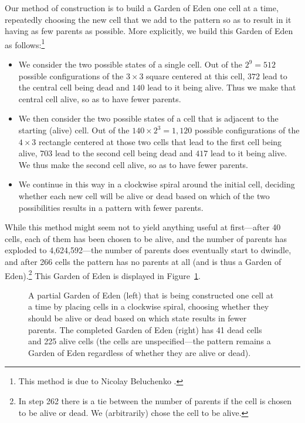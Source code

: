 Our method of construction is to build a Garden of Eden one cell at a time, repeatedly choosing the new cell that we add to the pattern so as to result in it having as few parents as possible. More explicitly, we build this Garden of Eden as follows:\footnote{This method is due to Nicolay Beluchenko \cite{A196447}.}\medskip

\begin{itemize}
	\item We consider the two possible states of a single cell. Out of the $2^9 = 512$ possible configurations of the $3 \times 3$ square centered at this cell, $372$ lead to the central cell being dead and $140$ lead to it being alive. Thus we make that central cell alive, so as to have fewer parents.\smallskip
	
	\item We then consider the two possible states of a cell that is adjacent to the starting (alive) cell. Out of the $140 \times 2^3 = 1,120$ possible configurations of the $4 \times 3$ rectangle centered at those two cells that lead to the first cell being alive, $703$ lead to the second cell being dead and $417$ lead to it being alive. We thus make the second cell alive, so as to have fewer parents.\smallskip
	
	\item We continue in this way in a clockwise spiral around the initial cell, deciding whether each new cell will be alive or dead based on which of the two possibilities results in a pattern with fewer parents.\medskip
\end{itemize}

While this method might seem not to yield anything useful at first---after 40 cells, each of them has been chosen to be alive, and the number of parents has exploded to 4,624,592---the number of parents does eventually start to dwindle, and after 266 cells the pattern has no parents at all (and is thus a Garden of Eden).\footnote{In step 262 there is a tie between the number of parents if the cell is chosen to be alive or dead. We (arbitrarily) chose the cell to be alive.} This Garden of Eden is displayed in Figure~\ref{fig:goe_1}.

\begin{figure}[!htb]
	\centering{}
	
	\caption{A partial Garden of Eden (left) that is being constructed one cell at a time by placing cells in a clockwise spiral, choosing whether they should be alive or dead based on which state results in fewer parents. The completed Garden of Eden (right) has 41 dead cells and 225 alive cells (the  cells are unspecified---the pattern remains a Garden of Eden regardless of whether they are alive or dead).}\label{fig:goe_1}
\end{figure}

